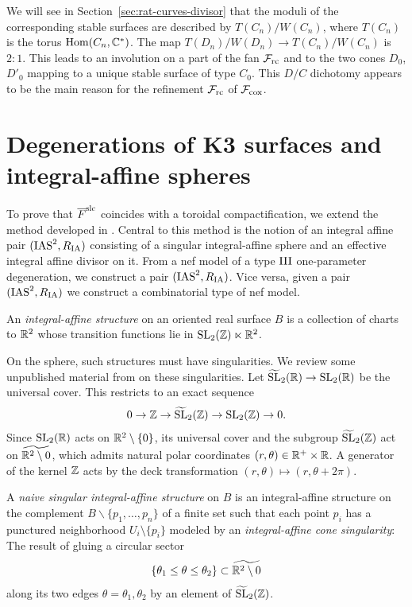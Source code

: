 \documentclass[table,x11names]{amsart}
\begin{document}
\begin{remark}
  We will see in Section~\ref{sec:rat-curves-divisor} that the moduli
  of the corresponding stable surfaces are described by
  $T(C_n)/W(C_n)$, where $T(C_n)$ is the torus $\operatorname{Hom}(C_n, {\mathbb C}^*)$. The
  map $T(D_n)/W(D_n) \to T(C_n)/W(C_n)$ is $2:1$.  This leads to an
  involution on a part of the fan ${\mathcal F}_{\rm rc}$ and to the two cones
  $D_0$, $D'_0$ mapping to a unique stable surface of type $C_0$. This
  $D/C$ dichotomy appears to be the main reason for the refinement
  ${\mathcal F}_{\rm rc}$ of ${\mathcal F}_{\rm cox}$.
\end{remark}


\section{Degenerations of K3 surfaces and integral-affine spheres}
\label{sec:ia-pairs}

To prove that ${\overline F}^{\rm slc}$ coincides with a toroidal
compactification, we extend the method developed in
\cite{alexeev2019stable-pair}. Central to this method is the notion of
an integral affine pair $(\operatorname{IAS}^2,R_{\rm IA})$ consisting of a singular integral-affine
sphere and an effective integral affine divisor on it.
From a nef model of a type $\III$ one-parameter degeneration, we
construct a pair $(\operatorname{IAS}^2,R_{\rm IA})$.  Vice versa, given a pair
$(\operatorname{IAS}^2,R_{\rm IA})$ we construct a combinatorial type of nef model.

\begin{definition} An {\it integral-affine structure} on an oriented real
  surface $B$ is a collection of charts to $\mathbb{R}^2$ whose transition
  functions lie in $\operatorname{SL}_2(\mathbb{Z})\ltimes \mathbb{R}^2$. \end{definition}

On the sphere, such structures must have singularities.
We review some unpublished material from
 \cite{engel2018moduli-space} on these singularities.
 Let $\widetilde{\operatorname{SL}}_2(\mathbb{R})\to \operatorname{SL}_2(\mathbb{R})$ be the universal cover. This
 restricts to an exact sequence $$0\to \mathbb{Z}\to \widetilde{\operatorname{SL}}_2(\mathbb{Z})\to \operatorname{SL}_2(\mathbb{Z})\to 0.$$
Since $\operatorname{SL}_2(\mathbb{R})$ acts on $\mathbb{R}^2\setminus \{0\}$, its universal cover and
the subgroup $\widetilde{\operatorname{SL}}_2(\mathbb{Z})$ act on
$\widetilde{\mathbb{R}^2\setminus 0}$,
which admits natural polar coordinates $(r,\theta)\in \mathbb{R}^+\times \mathbb{R}$. A generator of the kernel
$\mathbb{Z}$ acts by the deck transformation $(r,\theta)\mapsto (r,\theta+2\pi)$.

\begin{definition}\label{naiveias} A {\it naive singular integral-affine structure} on $B$
is an integral-affine structure on the complement $B\backslash \{p_1,\dots,p_n\}$ 
of a finite set such that each point $p_i$ has a punctured neighborhood $U_i\setminus \{p_i\}$
modeled by an {\it integral-affine cone singularity}: The result of gluing a circular sector $$
\{ \theta_1 \leq \theta \leq \theta_2\}\subset \widetilde{\mathbb{R}^2\setminus 0}$$
along its two edges $\theta=\theta_1,\theta_2$ by an element of $\widetilde{\operatorname{SL}}_2(\mathbb{Z})$.
 \end{definition}
 
\end{document}
